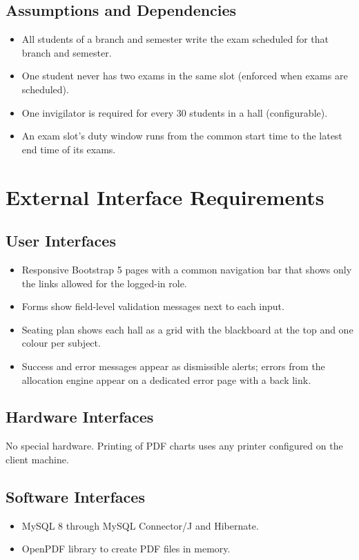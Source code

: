\documentclass[11pt,a4paper]{article}
\begin{document}
\subsection{Assumptions and Dependencies}
\begin{itemize}
  \item All students of a branch and semester write the exam scheduled for that branch and semester.
  \item One student never has two exams in the same slot (enforced when exams are scheduled).
  \item One invigilator is required for every 30 students in a hall (configurable).
  \item An exam slot's duty window runs from the common start time to the latest end time of its exams.
\end{itemize}

\section{External Interface Requirements}
\subsection{User Interfaces}
\begin{itemize}
  \item Responsive Bootstrap 5 pages with a common navigation bar that shows only the links allowed for the logged-in role.
  \item Forms show field-level validation messages next to each input.
  \item Seating plan shows each hall as a grid with the blackboard at the top and one colour per subject.
  \item Success and error messages appear as dismissible alerts; errors from the allocation engine appear on a dedicated error page with a back link.
\end{itemize}
\subsection{Hardware Interfaces}
No special hardware. Printing of PDF charts uses any printer configured on the client machine.
\subsection{Software Interfaces}
\begin{itemize}
  \item MySQL 8 through MySQL Connector/J and Hibernate.
  \item OpenPDF library to create PDF files in memory.
\end{itemize}
\end{document}
